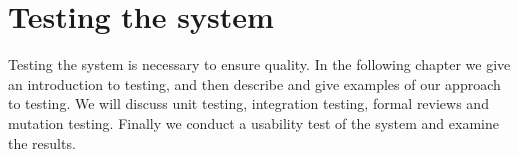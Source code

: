 \chapter{Testing the system}\label{chap:testing-the-system}
Testing the system is necessary to ensure quality.
In the following chapter we give an introduction to testing, and then describe and give examples of our approach to testing.
We will discuss unit testing, integration testing, formal reviews and mutation testing.
Finally we conduct a usability test of the system and examine the results.






